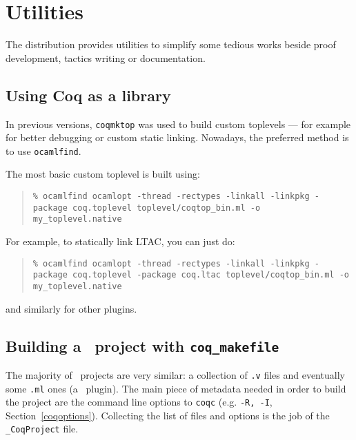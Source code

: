 \chapter[Utilities]{Utilities\label{Utilities}}

The distribution provides utilities to simplify some tedious works
beside proof development, tactics writing or documentation.

\section[Using Coq as a library]{Using Coq as a library}

In previous versions, \texttt{coqmktop} was used to build custom
toplevels --- for example for better debugging or custom static
linking. Nowadays, the preferred method is to use \texttt{ocamlfind}.

The most basic custom toplevel is built using:
\begin{quotation}
\texttt{\% ocamlfind ocamlopt -thread -rectypes -linkall -linkpkg
  -package coq.toplevel toplevel/coqtop\_bin.ml -o my\_toplevel.native}
\end{quotation}

For example, to statically link LTAC, you can just do:
\begin{quotation}
\texttt{\% ocamlfind ocamlopt -thread -rectypes -linkall -linkpkg
  -package coq.toplevel -package coq.ltac toplevel/coqtop\_bin.ml -o my\_toplevel.native}
\end{quotation}
and similarly for other plugins.


\section[Building a \Coq\ project with {\tt coq\_makefile}]
{Building a \Coq\ project with {\tt coq\_makefile}
\label{Makefile}
}

The majority of \Coq\ projects are very similar: a collection of {\tt .v}
files and eventually some {\tt .ml} ones (a \Coq\ plugin).  The main piece
of metadata needed in order to build the project are the command
line options to {\tt coqc} (e.g. {\tt -R, -I},
\SeeAlso Section~\ref{coqoptions}). Collecting the list of files and
options is the job of the {\tt \_CoqProject} file.

